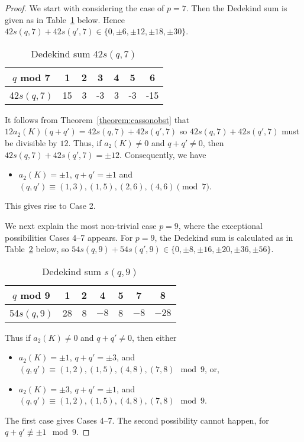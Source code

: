 \documentclass{amsart}
\theoremstyle{remark}
\theoremstyle{definition}
\begin{document}
\begin{proof}
We start with considering the case of $p=7$. 
Then the Dedekind sum is given as in Table~\ref{table0} below. 
Hence $42s(q,7)+42s(q',7) \in \{0,\pm 6,\pm 12, \pm 18,\pm 30\}$.

\begin{table}[htbp]
\centering
\begin{tabular}{|c|c|c|c|c|c|c|} \hline
$q$ mod 7& 1 & 2 & 3 & 4 & 5 & 6  \\ \hline 
42$s(q,7)$&15 & 3 & -3 & 3 & -3 & -15 \\ \hline
  \end{tabular}
\smallskip
\caption{Dedekind sum 42$s(q,7)$}\label{table0}
\end{table}

It follows from Theorem~\ref{theorem:cassonobst} that 
$12a_{2}(K)(q+q')=42s(q,7)+42s(q',7)$
so $42s(q,7)+42s(q',7)$ must be divisible by $12$. 
Thus, if $a_{2}(K)\neq 0$ and $q+q' \neq 0$, then $42s(q,7)+42s(q',7)= \pm 12$. Consequently, we have
\begin{itemize}
\item $a_{2}(K)= \pm 1$, $q+q'= \pm 1$ and  $(q,q') \equiv (1,3),(1,5),(2,6),(4,6) \pmod 7$. 
\end{itemize}
This gives rise to Case 2.

We next explain the most non-trivial case $p=9$, where the exceptional possibilities Cases 4--7 appears. 
For $p=9$, the Dedekind sum is calculated as in Table~\ref{table1} below, so  $54s(q,9)+54s(q',9) \in \{0,\pm8,\pm16,\pm20,\pm36,\pm56\}$.

\begin{table}[htbp]
\centering
\begin{tabular}{|c|c|c|c|c|c|c|} \hline
$q$ mod 9& 1 & 2 & 4 & 5 & 7 & 8  \\ \hline 
54$s(q,9)$&28 & 8 & $-8$ & 8 & $-8$ & $-28$ \\ \hline
  \end{tabular}
\smallskip
\caption{Dedekind sum $s(q,9)$}\label{table1}
\end{table}

Thus if $a_{2}(K)\neq 0$ and $q+q' \neq 0$, then either
\begin{itemize}
\item $a_{2}(K) = \pm 1$, $q+q'=\pm 3$, and $(q,q') \equiv (1,2),(1,5),(4,8),(7,8) \mod 9$, or,
\item $a_{2}(K) = \pm 3$, $q+q'=\pm 1$, and $(q,q') \equiv (1,2),(1,5),(4,8),(7,8) \mod 9$. 
\end{itemize}
The first case gives Cases 4--7. 
The second possibility cannot happen, for $q+q' \not \equiv \pm 1 \mod 9$. 
\end{proof}
\end{document}
